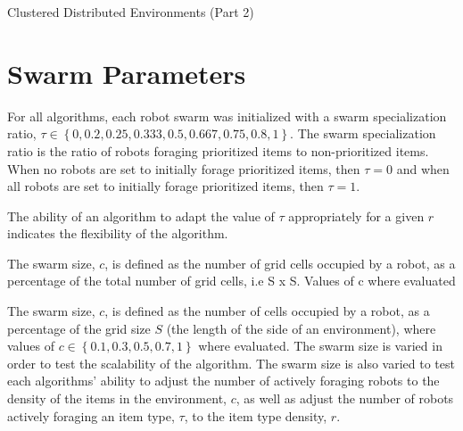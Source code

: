 \begin{algorithm}

\caption{Clustered Distributed Environments (Part 2)}
\label{algorithm:clustered2}
\begin{algorithmic}[1]
	  \State {}
	  \State {}
	  \State {}
	
		  \State {}
		  \State {}
		  \State {}
				
        	\State {}
        	\State {}
				  \State {}
				  \State {}	
			  \EndIf
		  \EndWhile
		\EndIf
	\EndWhile
\EndFunction
\end{algorithmic}
\end{algorithm}


\section{Swarm Parameters}
\label{swarmparameters}

For all algorithms, each robot swarm was initialized with 
a swarm specialization ratio, $\tau\in\left\{0, 0.2, 0.25, 0.333, 0.5, 0.667, 0.75, 0.8,1\right\}$. The swarm specialization ratio is the ratio of robots foraging prioritized items to non-prioritized items. When no robots are set to initially forage prioritized items, then $\tau=0$ and when all robots are set to initially forage prioritized items, then $\tau=1$.

The ability of an algorithm to adapt the value of $\tau$ appropriately for a given $r$ indicates the flexibility of the algorithm.


The swarm size, $c$, is defined as the number of grid cells occupied by a robot, as a percentage of the total number of grid cells, i.e S x S. Values of c where evaluated


The swarm size, $c$, is defined as the number of cells occupied by a robot, as a percentage of the grid size $S$ (the length of the side of an environment), where values of $c\in\left\{0.1, 0.3, 0.5, 0.7, 1\right\}$ where evaluated. The swarm size is varied in order to test the scalability of the algorithm. The swarm size is also varied to test each algorithms' ability to adjust the number of actively foraging robots to the density of the items in the environment, $c$, as well as adjust the number of robots actively foraging an item type, $\tau$, to the item type density, $r$.

